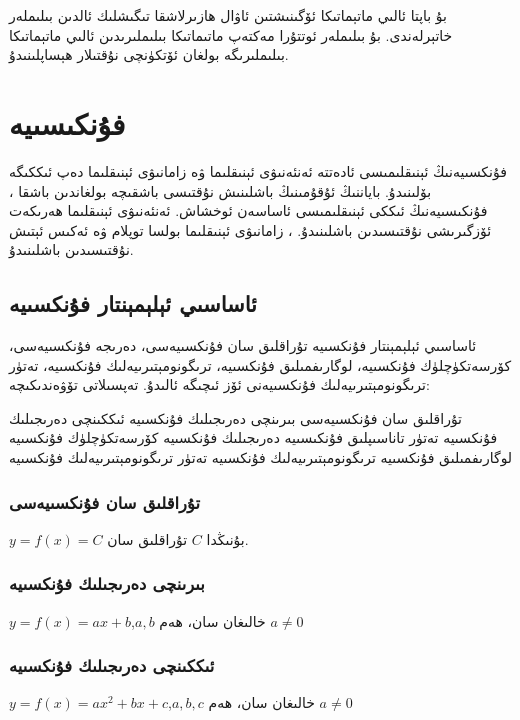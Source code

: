 \par\bigskip
\begin{tcolorbox}
بۇ باپتا ئالىي ماتېماتىكا ئۆگىنىشتىن ئاۋال ھازىرلاشقا تىگىشلىك ئالدىن بىلىملەر خاتېرلەندى. بۇ بىلىملەر ئوتتۇرا مەكتەپ ماتىماتىكا بىلىملىرىدىن ئالىي ماتېماتىكا بىلىملىرىگە بولغان ئۆتكۈنچى نۇقتىلار ھېساپلىنىدۇ.
\end{tcolorbox}

\section{فۇنكىسىيە}
فۇنكسىيەنىڭ ئېنىقلىمىسى ئادەتتە ئەنئەنىۋى ئېنىقلىما ۋە زامانىۋى ئېنىقلىما دەپ ئىككىگە بۆلىنىدۇ. باياننىڭ ئۇقۇمىنىڭ باشلىنىش نۇقتىسى باشقىچە بولغاندىن باشقا ، فۇنكىسىيەنىڭ ئىككى ئېنىقلىمىسى ئاساسەن ئوخشاش. ئەنئەنىۋى ئېنىقلىما ھەرىكەت ئۆزگىرىشى نۇقتىسىدىن باشلىنىدۇ. ، زامانىۋى ئېنىقلىما بولسا توپلام ۋە ئەكىس ئېتىش نۇقتىسىدىن باشلىنىدۇ.

\subsection{ئاساسىي ئېلېمېنتار فۇنكسىيە }
ئاساسىي ئېلېمېنتار فۇنكسىيە تۇراقلىق سان فۇنكسىيەسى، دەرىجە فۇنكسىيەسى، كۆرسەتكۈچلۈك فۇنكسىيە، لوگارىفمىلىق فۇنكسىيە، ترىگونومېتىرىيەلىك فۇنكسىيە، تەتۈر ترىگونومېتىرىيەلىك فۇنكسىيەنى ئۆز ئىچىگە ئالىدۇ. تەپسىلاتى تۆۋەندىكىچە:

تۇراقلىق سان فۇنكسىيەسى
بىرىنچى دەرىجىلىك فۇنكسىيە
ئىككىنچى دەرىجىلىك فۇنكسىيە
تەتۈر تاناسىپلىق فۇنكىسىيە
دەرىجىلىك فۇنكسىيە
كۆرسەتكۈچلۈك فۇنكسىيە
لوگارىفمىلىق فۇنكسىيە
ترىگونومېتىرىيەلىك فۇنكسىيە
تەتۈر ترىگونومېتىرىيەلىك فۇنكسىيە

\subsubsection{تۇراقلىق سان فۇنكسىيەسى}\par\bigskip
$y=f(x)=C$ بۇنىڭدا $C$ تۇراقلىق سان. 

\subsubsection{بىرىنچى دەرىجىلىك فۇنكسىيە}
$y=f(x)=ax+b$,$a,b$ خالىغان سان، ھەم
$a \neq 0$

\subsubsection{ئىككىنچى دەرىجىلىك فۇنكسىيە}
$y=f(x)=ax^2+bx+c$,$a,b,c$ خالىغان سان، ھەم
$a \neq 0$

